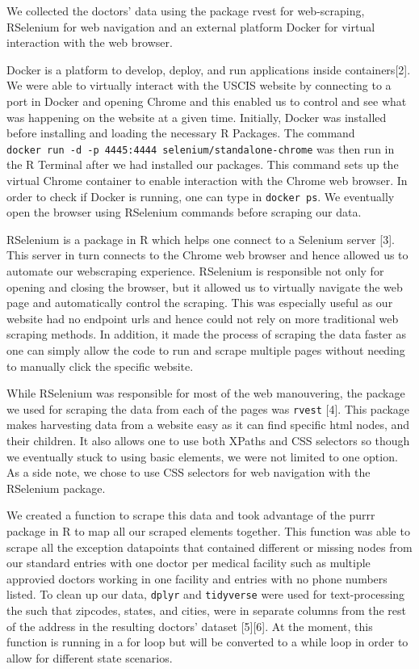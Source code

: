 \documentclass[10pt,letterpaper]{article}
\begin{document}
We collected the doctors' data using the package rvest for web-scraping,
RSelenium for web navigation and an external platform Docker for virtual
interaction with the web browser.

Docker is a platform to develop, deploy, and run applications inside
containers{[}2{]}. We were able to virtually interact with the USCIS
website by connecting to a port in Docker and opening Chrome and this
enabled us to control and see what was happening on the website at a
given time. Initially, Docker was installed before installing and
loading the necessary R Packages. The command
\texttt{docker\ run\ -d\ -p\ 4445:4444\ selenium/standalone-chrome} was
then run in the R Terminal after we had installed our packages. This
command sets up the virtual Chrome container to enable interaction with
the Chrome web browser. In order to check if Docker is running, one can
type in \texttt{docker\ ps}. We eventually open the browser using
RSelenium commands before scraping our data.

RSelenium is a package in R which helps one connect to a Selenium server
{[}3{]}. This server in turn connects to the Chrome web browser and
hence allowed us to automate our webscraping experience. RSelenium is
responsible not only for opening and closing the browser, but it allowed
us to virtually navigate the web page and automatically control the
scraping. This was especially useful as our website had no endpoint urls
and hence could not rely on more traditional web scraping methods. In
addition, it made the process of scraping the data faster as one can
simply allow the code to run and scrape multiple pages without needing
to manually click the specific website.

While RSelenium was responsible for most of the web manouvering, the
package we used for scraping the data from each of the pages was
\texttt{rvest} {[}4{]}. This package makes harvesting data from a
website easy as it can find specific html nodes, and their children. It
also allows one to use both XPaths and CSS selectors so though we
eventually stuck to using basic elements, we were not limited to one
option. As a side note, we chose to use CSS selectors for web navigation
with the RSelenium package.

We created a function to scrape this data and took advantage of the
purrr package in R to map all our scraped elements together. This
function was able to scrape all the exception datapoints that contained
different or missing nodes from our standard entries with one doctor per
medical facility such as multiple approvied doctors working in one
facility and entries with no phone numbers listed. To clean up our data,
\texttt{dplyr} and \texttt{tidyverse} were used for text-processing the
such that zipcodes, states, and cities, were in separate columns from
the rest of the address in the resulting doctors' dataset
{[}5{]}{[}6{]}. At the moment, this function is running in a for loop
but will be converted to a while loop in order to allow for different
state scenarios.
\end{document}
